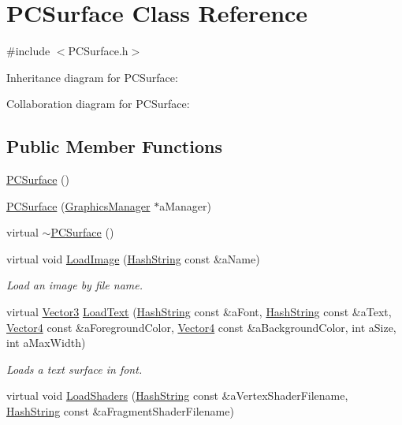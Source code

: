 \hypertarget{classPCSurface}{}\section{P\+C\+Surface Class Reference}
\label{classPCSurface}


{\ttfamily \#include $<$P\+C\+Surface.\+h$>$}



Inheritance diagram for P\+C\+Surface\+:


Collaboration diagram for P\+C\+Surface\+:
\subsection*{Public Member Functions}
\begin{DoxyCompactItemize}
\item 
\hyperlink{classPCSurface_a4b7985b536ea1ec4a68c1847c4fc0fdb}{P\+C\+Surface} ()
\item 
\hyperlink{classPCSurface_a58052b2dd4883b6065686d8c5b5d806c}{P\+C\+Surface} (\hyperlink{classGraphicsManager}{Graphics\+Manager} $\ast$a\+Manager)
\item 
virtual \hyperlink{classPCSurface_a6748b7264989359648ae3131583eb03d}{$\sim$\+P\+C\+Surface} ()
\item 
virtual void \hyperlink{classPCSurface_a657bfb03f74cbb36e81b46882f37596d}{Load\+Image} (\hyperlink{classHashString}{Hash\+String} const \&a\+Name)
\begin{DoxyCompactList}\small\item\em Load an image by file name. \end{DoxyCompactList}\item 
virtual \hyperlink{structVector3}{Vector3} \hyperlink{classPCSurface_a00445d9f691b18c909d11d0987f66c6b}{Load\+Text} (\hyperlink{classHashString}{Hash\+String} const \&a\+Font, \hyperlink{classHashString}{Hash\+String} const \&a\+Text, \hyperlink{structVector4}{Vector4} const \&a\+Foreground\+Color, \hyperlink{structVector4}{Vector4} const \&a\+Background\+Color, int a\+Size, int a\+Max\+Width)
\begin{DoxyCompactList}\small\item\em Loads a text surface in font. \end{DoxyCompactList}\item 
virtual void \hyperlink{classPCSurface_adabab53e2036848efc1fe5404f087005}{Load\+Shaders} (\hyperlink{classHashString}{Hash\+String} const \&a\+Vertex\+Shader\+Filename, \hyperlink{classHashString}{Hash\+String} const \&a\+Fragment\+Shader\+Filename)

\end{DoxyCompactItemize}
